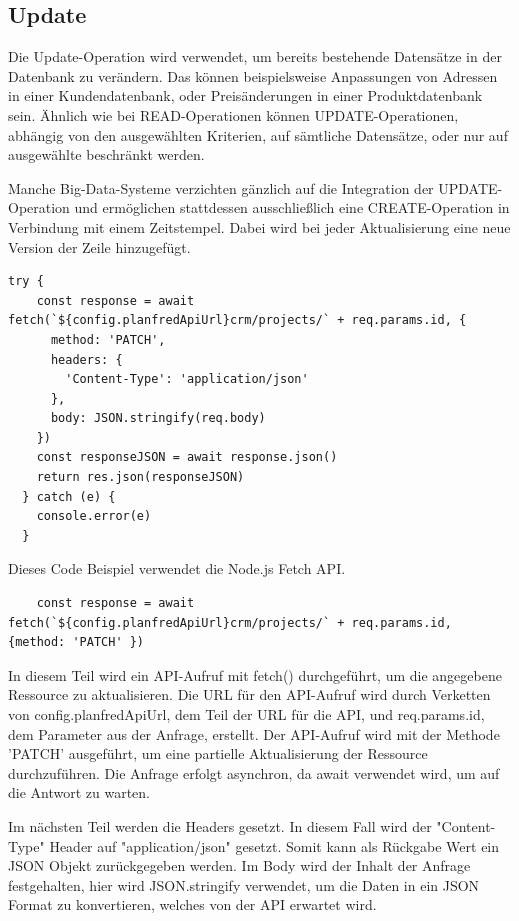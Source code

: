 \subsection{Update}

Die Update-Operation wird verwendet, um bereits bestehende Datensätze in der Datenbank zu verändern. Das können beispielsweise Anpassungen von Adressen in einer Kundendatenbank, oder Preisänderungen in einer Produktdatenbank sein. Ähnlich wie bei READ-Operationen können UPDATE-Operationen, abhängig von den ausgewählten Kriterien, auf sämtliche Datensätze, oder nur auf ausgewählte beschränkt werden.

Manche Big-Data-Systeme verzichten gänzlich auf die Integration der UPDATE-Operation und ermöglichen stattdessen ausschließlich eine CREATE-Operation in Verbindung mit einem Zeitstempel. Dabei wird bei jeder Aktualisierung eine neue Version der Zeile hinzugefügt.

\begin{lstlisting}
try {
    const response = await fetch(`${config.planfredApiUrl}crm/projects/` + req.params.id, {
      method: 'PATCH',
      headers: {
        'Content-Type': 'application/json'
      },
      body: JSON.stringify(req.body)
    })
    const responseJSON = await response.json()
    return res.json(responseJSON)
  } catch (e) {
    console.error(e)
  }
\end{lstlisting}

Dieses Code Beispiel verwendet die Node.js Fetch API. 

\begin{lstlisting}
    const response = await fetch(`${config.planfredApiUrl}crm/projects/` + req.params.id, {method: 'PATCH' })
\end{lstlisting}

In diesem Teil wird ein API-Aufruf mit fetch() durchgeführt, um die angegebene Ressource zu aktualisieren. Die URL für den API-Aufruf wird durch Verketten von config.planfredApiUrl, dem Teil der URL für die API, und req.params.id, dem Parameter aus der Anfrage, erstellt. Der API-Aufruf wird mit der Methode 'PATCH' ausgeführt, um eine partielle Aktualisierung der Ressource durchzuführen. Die Anfrage erfolgt asynchron, da await verwendet wird, um auf die Antwort zu warten.\newline

Im nächsten Teil werden die Headers gesetzt. In diesem Fall wird der "Content-Type" Header auf "application/json" gesetzt. Somit kann als Rückgabe Wert ein JSON Objekt zurückgegeben werden. Im Body wird der Inhalt der Anfrage festgehalten, hier wird JSON.stringify verwendet, um die Daten in ein JSON Format zu konvertieren, welches von der API erwartet wird.

